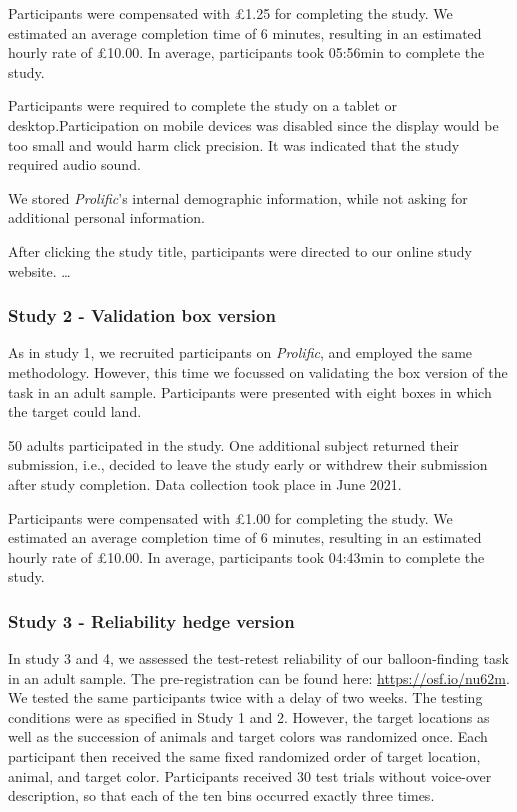\documentclass[
  english,
  man,floatsintext]{apa6}
\begin{document}
Participants were compensated with £1.25 for completing the study. We estimated an average completion time of 6 minutes, resulting in an estimated hourly rate of £10.00. In average, participants took 05:56min to complete the study.

Participants were required to complete the study on a tablet or desktop.Participation on mobile devices was disabled since the display would be too small and would harm click precision. It was indicated that the study required audio sound.

We stored \emph{Prolific}'s internal demographic information,
while not asking for additional personal information.

After clicking the study title, participants were directed to our online study website.
\ldots{}

\hypertarget{study-2---validation-box-version}{%
\subsubsection{Study 2 - Validation box version}\label{study-2---validation-box-version}}

As in study 1, we recruited participants on \emph{Prolific}, and employed the same methodology. However, this time we focussed on validating the box version of the task in an adult sample. Participants were presented with eight boxes in which the target could land.

50 adults participated in the study. One additional subject returned their submission, i.e., decided to leave the study early or withdrew their submission after study completion. Data collection took place in June 2021.

Participants were compensated with £1.00 for completing the study. We estimated an average completion time of 6 minutes, resulting in an estimated hourly rate of £10.00. In average, participants took 04:43min to complete the study.

\hypertarget{study-3---reliability-hedge-version}{%
\subsubsection{Study 3 - Reliability hedge version}\label{study-3---reliability-hedge-version}}

In study 3 and 4, we assessed the test-retest reliability of our balloon-finding task in an adult sample. The pre-registration can be found here: \url{https://osf.io/nu62m}. We tested the same participants twice with a delay of two weeks. The testing conditions were as specified in Study 1 and 2. However, the target locations as well as the succession of animals and target colors was randomized once. Each participant then received the same fixed randomized order of target location, animal, and target color. Participants received 30 test trials without voice-over description, so that each of the ten bins occurred exactly three times.
\end{document}
